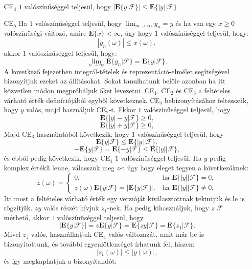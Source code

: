 \documentclass{article}
\begin{document}
CE$_4$ $1$ valószínűséggel teljesül, hogy $|\mathrm{\textbf{E}}\{y | \mathscr{F} \}| \leq \mathrm{\textbf{E}}\{|y| | \mathscr{F} \} $

CE$_5$ Ha $1$ valószínűséggel teljesül, hogy $ \lim_{m \to \infty} y_n = y$ és ha van egy $x \geq 0$ valószínűségi változó, amire $\mathrm{\textbf{E}}\{x\} < \infty$, úgy hogy $1$ valószínűséggel teljesül, hogy:
\[
 |y_n(\omega)| \leq x(\omega),
\]
akkor $1$ valószínűséggel teljesül, hogy:
\[
 \lim_{n \to \infty} \mathrm{\textbf{E}}\{  y_n | \mathscr{F} \} = \mathrm{\textbf{E}}\{  y | \mathscr{F} \}.
\]
A következő fejezetben integrál-tételek és reprezentáció-elmélet segítségével bizonyítjuk ezeket az állításokat. Sokat tanulhatunk belőle azonban ha itt közvetlen módon megpróbáljuk őket levezetni. CE$_1$, CE$_2$ és CE$_3$ a feltételes várható érték definíciójából egyből következnek. CE$_4$ bebizonyításához feltesszük, hogy $y$ valós, majd használjuk CE$_2$-t. Ekkor $1$ valószínűséggel teljesül, hogy
\[
  \mathrm{\textbf{E}}\{|y| - y | \mathscr{F} \} \geq 0,
\]
\[
  \mathrm{\textbf{E}}\{|y| + y | \mathscr{F} \} \geq 0,
\]
Majd CE$_3$ használatából következik, hogy $1$ valószínűséggel teljesül, hogy
\[
  \mathrm{\textbf{E}}\{y | \mathscr{F} \} \leq \mathrm{\textbf{E}}\{|y| | \mathscr{F} \},
\]
\[
  -\mathrm{\textbf{E}}\{y | \mathscr{F} \} = \mathrm{\textbf{E}}\{-y | \mathscr{F} \} \leq \mathrm{\textbf{E}}\{|y| | \mathscr{F} \},
\]
és ebből pedig következik, hogy CE$_4$ $1$ valószínűséggel teljesül. Ha $y$ pedig komplex értékű lenne, válasszuk meg $z$-t úgy hogy eleget tegyen a következőknek:
\[
z(\omega) = \begin{cases}
    0, & \text{ha } \mathrm{\textbf{E}}\{|y| | \mathscr{F} \} = 0, \\
    z(\omega)\mathrm{\textbf{E}}\{y | \mathscr{F} \} = |\mathrm{\textbf{E}}\{y | \mathscr{F} \}|, & \text{ha } \mathrm{\textbf{E}}\{|y| | \mathscr{F} \} \neq 0.
\end{cases}
\]
Itt most a feltételes várható érték egy verzióját kiválasztottnak tekintjük és le is rögzítjük. $zy$ valós részét hívjuk $z_1$-nek. Ha pedig kihasználjuk, hogy $z$ $\mathscr{F}$ mérhető, akkor $1$ valószínűséggel teljesül, hogy
\[
 |\mathrm{\textbf{E}}\{y | \mathscr{F} \}| = z \mathrm{\textbf{E}}\{y | \mathscr{F} \} = \mathrm{\textbf{E}}\{zy | \mathscr{F} \} = \mathrm{\textbf{E}}\{z_1 | \mathscr{F} \}.
\]
Mivel $z_1$ valós, használhatjuk CE$_4$ valós változazát, amit már be is bizonyítottunk, és további egyenlőtlenséget írhatunk fel, hiszen: 
\[
 |z_1(\omega)| \leq |y(\omega)|,
\]
és így megkaphatjuk a bizonyítandót:
\end{document}
